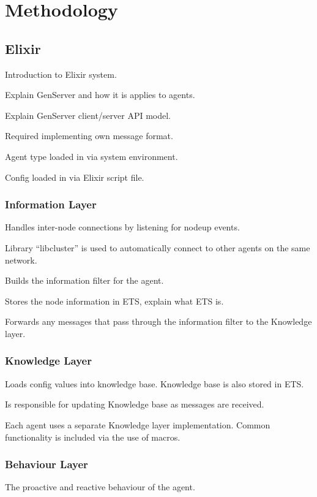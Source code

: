 \section{Methodology}

\subsection{Elixir}

Introduction to Elixir system.

Explain GenServer and how it is applies to agents.

Explain GenServer client/server API model.

Required implementing own message format.

Agent type loaded in via system environment.

Config loaded in via Elixir script file.

\subsubsection{Information Layer}

Handles inter-node connections by listening for nodeup events.

Library ``libcluster'' is used to automatically connect to other agents on the same network.

Builds the information filter for the agent.

Stores the node information in ETS, explain what ETS is.

Forwards any messages that pass through the information filter to the Knowledge layer.

\subsubsection{Knowledge Layer}

Loads config values into knowledge base.
Knowledge base is also stored in ETS\@.

Is responsible for updating Knowledge base as messages are received.

Each agent uses a separate Knowledge layer implementation.
Common functionality is included via the use of macros.

\subsubsection{Behaviour Layer}

The proactive and reactive behaviour of the agent.

